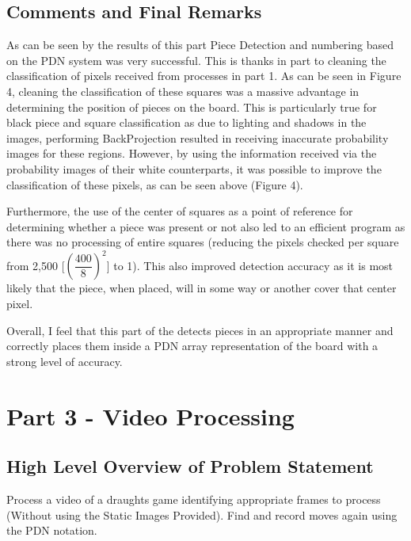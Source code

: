 \documentclass[11pt]{article}
\begin{document}
    \subsection{Comments and Final Remarks}
    \par
    As can be seen by the results of this part Piece Detection and numbering based on the PDN system was very successful. This is thanks in part to cleaning the classification of pixels received
    from processes in part 1. As can be seen in Figure 4, cleaning the classification of these squares was a massive advantage in determining the position of pieces on the board. This is particularly
    true for black piece and square classification as due to lighting and shadows in the images, performing BackProjection resulted in receiving inaccurate probability images for these regions. However, by
    using the information received via the probability images of their white counterparts, it was possible to improve the classification of these pixels, as can be seen above (Figure 4).
    \par
    Furthermore, the use of the center of squares as a point of reference for determining whether a piece was present or not also led to an efficient program as there was no processing of entire squares 
    (reducing the pixels checked per square from 2,500 [\((\dfrac{400}{8})^2\)] to 1). This also improved detection accuracy as it is most likely that the piece, when placed, will in some way or another cover 
    that center pixel.
    \par
    Overall, I feel that this part of the detects pieces in an appropriate manner and correctly places them inside a PDN array representation of the board with a strong level of accuracy. 

    \newpage
    \section{Part 3 - Video Processing}
    \subsection{High Level Overview of Problem Statement}
    \par
    Process a video of a draughts game identifying appropriate frames to process (Without using the Static Images Provided). Find and record moves again using the PDN notation.
\end{document}
